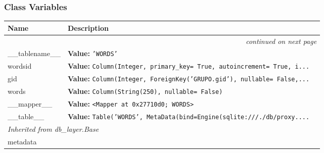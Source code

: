 
  \subsubsection{Class Variables}

    \vspace{-1cm}
\hspace{\varindent}\begin{longtable}{|p{\varnamewidth}|p{\vardescrwidth}|l}
\cline{1-2}
\cline{1-2} \centering \textbf{Name} & \centering \textbf{Description}& \\
\cline{1-2}
\endhead\cline{1-2}\multicolumn{3}{r}{\small\textit{continued on next page}}\\\endfoot\cline{1-2}
\endlastfoot\raggedright \_\-\_\-t\-a\-b\-l\-e\-n\-a\-m\-e\-\_\-\_\- & \raggedright \textbf{Value:} 
{\tt \texttt{'}\texttt{WORDS}\texttt{'}}&\\
\cline{1-2}
\raggedright w\-o\-r\-d\-s\-i\-d\- & \raggedright \textbf{Value:} 
{\tt Column(Integer, primary\_key= True, autoincrement= True, i\texttt{...}}&\\
\cline{1-2}
\raggedright g\-i\-d\- & \raggedright \textbf{Value:} 
{\tt Column(Integer, ForeignKey('GRUPO.gid'), nullable= False,\texttt{...}}&\\
\cline{1-2}
\raggedright w\-o\-r\-d\-s\- & \raggedright \textbf{Value:} 
{\tt Column(String(250), nullable= False)}&\\
\cline{1-2}
\raggedright \_\-\_\-m\-a\-p\-p\-e\-r\-\_\-\_\- & \raggedright \textbf{Value:} 
{\tt {\textless}Mapper at 0x27710d0; WORDS{\textgreater}}&\\
\cline{1-2}
\raggedright \_\-\_\-t\-a\-b\-l\-e\-\_\-\_\- & \raggedright \textbf{Value:} 
{\tt Table('WORDS', MetaData(bind=Engine(sqlite:///./db/proxy.\texttt{...}}&\\
\cline{1-2}
\multicolumn{2}{|l|}{\textit{Inherited from db\_layer.Base}}\\
\multicolumn{2}{|p{\varwidth}|}{\raggedright metadata}\\
\cline{1-2}
\end{longtable}



